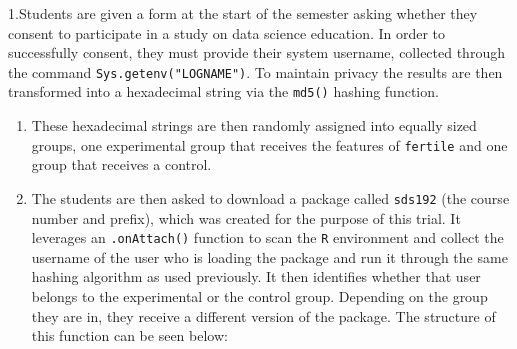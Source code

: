 \documentclass[12pt,twoside]{reedthesis}
\begin{document}
1.Students are given a form at the start of the semester asking whether
they consent to participate in a study on data science education. In
order to successfully consent, they must provide their system username,
collected through the command \texttt{Sys.getenv("LOGNAME")}. To
maintain privacy the results are then transformed into a hexadecimal
string via the \texttt{md5()} hashing function.
\begin{enumerate}
\def\labelenumi{\arabic{enumi}.}
\setcounter{enumi}{1}
\item
  These hexadecimal strings are then randomly assigned into equally
  sized groups, one experimental group that receives the features of
  \texttt{fertile} and one group that receives a control.
\item
  The students are then asked to download a package called
  \texttt{sds192} (the course number and prefix), which was created for
  the purpose of this trial. It leverages an \texttt{.onAttach()}
  function to scan the \texttt{R} environment and collect the username
  of the user who is loading the package and run it through the same
  hashing algorithm as used previously. It then identifies whether that
  user belongs to the experimental or the control group. Depending on
  the group they are in, they receive a different version of the
  package. The structure of this function can be seen below:
\end{enumerate}
\end{document}
